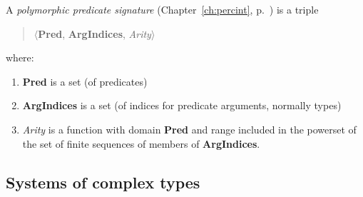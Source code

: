 \medskip

A \textit{polymorphic predicate signature} (Chapter~\ref{ch:percint}, p.~\pageref{ex:poly-pred-sig})
is a triple 
\begin{quote}
$\langle$\textbf{Pred}, \textbf{ArgIndices}, \textit{Arity}$\rangle$
\end{quote}
where:
\begin{enumerate} 
 
\item \textbf{Pred} is a set (of predicates)

\item \textbf{ArgIndices} is a set (of indices for predicate
  arguments, normally types)
 
\item \textit{Arity} is a function with domain \textbf{Pred} and range
  included in the powerset of the set of finite sequences of members
  of \textbf{ArgIndices}. 
 
\end{enumerate}
 

\subsection{Systems of complex types}
\label{app:comptypes}

